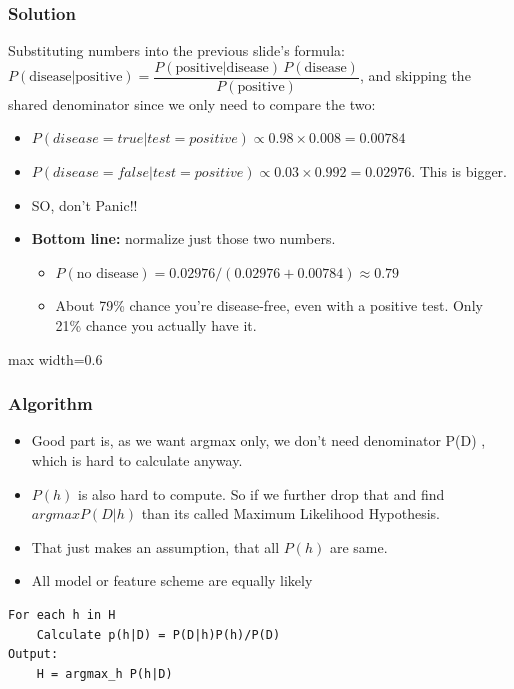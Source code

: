 \begin{frame}[fragile]\frametitle{Solution}
Substituting numbers into the previous slide's formula: $P(\text{disease}|\text{positive}) = \dfrac{P(\text{positive}|\text{disease})\,P(\text{disease})}{P(\text{positive})}$, and skipping the shared denominator since we only need to compare the two:
\begin{itemize}
\item $P(disease=true|test=positive) \propto 0.98 \times 0.008 = 0.00784$
\item $P(disease=false|test=positive) \propto 0.03\times 0.992 = 0.02976$. This is bigger.
\item SO, don’t Panic!!
\item \textbf{Bottom line:} normalize just those two numbers.
  \begin{itemize}
  \item[] $P(\text{no disease}) = 0.02976/(0.02976+0.00784) \approx 0.79$
  \item[] About 79\% chance you're disease-free, even with a positive test. Only 21\% chance you actually have it.
  \end{itemize}
\end{itemize}

\begin{center}
\begin{adjustbox}{max width=0.6\linewidth}
\end{adjustbox}
\end{center}

\end{frame}

\begin{frame}[fragile]\frametitle{Algorithm}



\begin{itemize}
\item Good part is, as we want argmax only, we don’t need denominator P(D) , which is hard to calculate anyway.
\item $P(h)$ is also hard to compute. So if we further drop that and find $argmax P(D|h)$ than its called Maximum Likelihood Hypothesis. 
\item That just makes an assumption, that all $P(h)$ are same. 
\item All model or feature scheme are equally likely
\end{itemize}

\begin{lstlisting}
For each h in H
    Calculate p(h|D) = P(D|h)P(h)/P(D)
Output:
    H = argmax_h P(h|D)

\end{lstlisting}

\end{frame}

